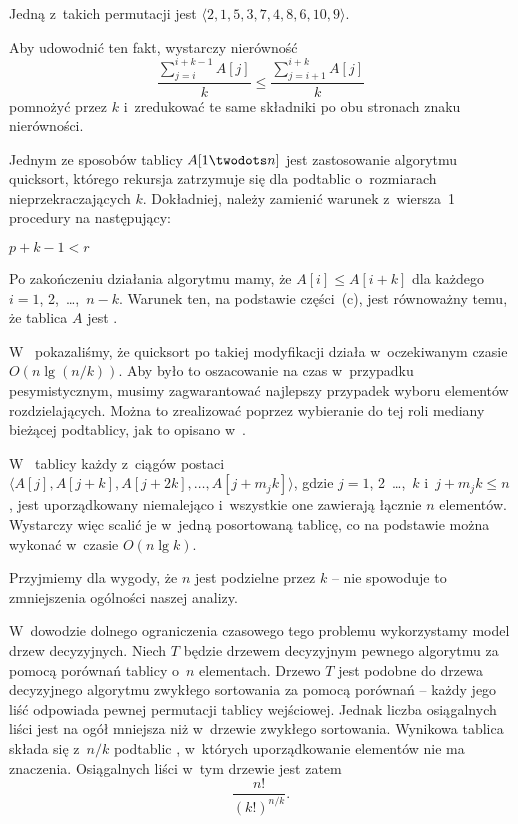 \subproblem %
Jedną z~takich permutacji jest $\langle2,1,5,3,7,4,8,6,10,9\rangle$.

\subproblem %
Aby udowodnić ten fakt, wystarczy nierówność
\[
	\frac{\sum_{j=i}^{i+k-1}A[j]}{k} \le \frac{\sum_{j=i+1}^{i+k}A[j]}{k}
\]
pomnożyć przez $k$ i~zredukować te same składniki po obu stronach znaku nierówności.

\subproblem %
Jednym ze sposobów  tablicy $A[1\twodots n]$ jest zastosowanie algorytmu quicksort, którego rekursja zatrzymuje się dla podtablic o~rozmiarach nieprzekraczających $k$. Dokładniej, należy zamienić warunek z~wiersza~1 procedury  na następujący:
\begin{codebox}
\li	\If $p+k-1<r$
\end{codebox}
Po zakończeniu działania algorytmu mamy, że $A[i]\le A[i+k]$ dla każdego $i=1$, 2,~\dots,~$n-k$. Warunek ten, na podstawie części~(c), jest równoważny temu, że tablica $A$ jest .

W~ pokazaliśmy, że quicksort po takiej modyfikacji działa w~oczekiwanym czasie $O(n\lg(n/k))$. Aby było to oszacowanie na czas w~przypadku pesymistycznym, musimy zagwarantować najlepszy przypadek wyboru elementów rozdzielających. Można to zrealizować poprzez wybieranie do tej roli mediany bieżącej podtablicy, jak to opisano w~.

\subproblem %
W~ tablicy każdy z~ciągów postaci $\langle A[j],A[j+k],A[j+2k],\dots,A[j+m_jk]\rangle$, gdzie $j=1$, 2~\dots,~$k$ i~$j+m_jk\le n$, jest uporządkowany niemalejąco i~wszystkie one zawierają łącznie $n$ elementów. Wystarczy więc scalić je w~jedną posortowaną tablicę, co na podstawie  można wykonać w~czasie $O(n\lg k)$.

\subproblem %
Przyjmiemy dla wygody, że $n$ jest podzielne przez $k$ -- nie spowoduje to zmniejszenia ogólności naszej analizy.

W~dowodzie dolnego ograniczenia czasowego tego problemu wykorzystamy model drzew decyzyjnych. Niech $T$ będzie drzewem decyzyjnym pewnego algorytmu  za pomocą porównań tablicy o~$n$ elementach. Drzewo $T$ jest podobne do drzewa decyzyjnego algorytmu zwykłego sortowania za pomocą porównań -- każdy jego liść odpowiada pewnej permutacji tablicy wejściowej. Jednak liczba osiągalnych liści jest na ogół mniejsza niż w~drzewie zwykłego sortowania. Wynikowa tablica składa się z~$n/k$ podtablic , w~których uporządkowanie elementów nie ma znaczenia. Osiągalnych liści w~tym drzewie jest zatem
\[
    \frac{n!}{(k!)^{n/k}}.
\]

